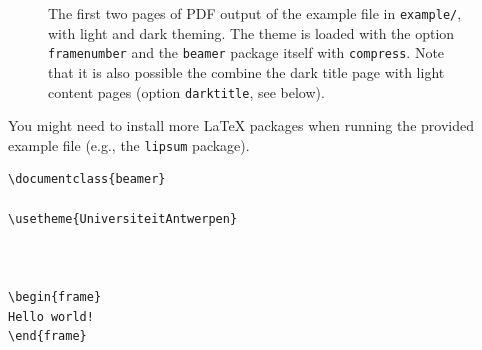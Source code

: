 \begin{figure}
\centering
\setlength{\figurewidth}{6cm}


\caption{The first two pages of PDF output of the example file in
\lstinline!example/!, with light and dark theming. The theme is loaded with the
option \lstinline!framenumber! and the \texttt{beamer} package itself with
\lstinline!compress!. Note that it is also possible the combine the dark title
page with light content pages (option \lstinline!darktitle!, see below).}
\label{fig:example1}
\end{figure}

\begin{note}
You might need to install more \LaTeX{} packages when running the provided
example file (e.g., the \texttt{lipsum} package).
\end{note}

\begin{lstlisting}[float,caption={A minimalistic test file for the LS Beamer theme.},captionpos=b,label=listing:minex,abovecaptionskip=\bigskipamount]
\documentclass{beamer}

\usetheme{UniversiteitAntwerpen}



\begin{frame}
Hello world!
\end{frame}


\end{lstlisting}
